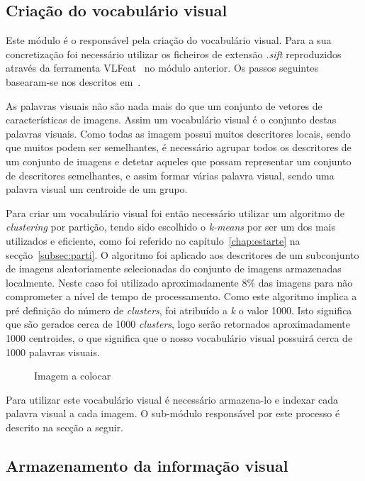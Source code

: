 \subsection{Criação do vocabulário visual}

Este módulo é o responsável pela criação do vocabulário visual. Para a sua concretização foi necessário utilizar os ficheiros de extensão \textit{.sift} reproduzidos através da ferramenta VLFeat~\cite{vedaldi08vlfeat} no módulo anterior. Os passos seguintes basearam-se nos descritos em~\cite{Solem2012}. 

As palavras visuais não são nada mais do que um conjunto de vetores de características de imagens. Assim um vocabulário visual é o conjunto destas palavras visuais. Como todas as imagem possui muitos descritores locais, sendo que muitos podem ser semelhantes, é necessário agrupar todos os descritores de um conjunto de imagens e detetar aqueles que possam representar um conjunto de descritores semelhantes, e assim formar várias palavra visual, sendo uma palavra visual um centroide de um grupo.

Para criar um vocabulário visual foi então necessário utilizar um algoritmo de \textit{clustering} por partição, tendo sido escolhido o \textit{k-means} por ser um dos mais utilizados e eficiente, como foi referido no capítulo~\ref{chap:estarte} na secção~\ref{subsec:parti}. O algoritmo foi aplicado aos descritores de um subconjunto de imagens aleatoriamente selecionadas do conjunto de imagens armazenadas localmente. Neste caso foi utilizado aproximadamente 8\% das imagens para não comprometer a nível de tempo de processamento. Como este algoritmo implica a pré definição do número de \textit{clusters}, foi atribuído a \textit{k} o valor 1000. Isto significa que são gerados cerca de 1000 \textit{clusters}, logo serão retornados aproximadamente 1000 centroides, o que significa que o nosso vocabulário visual possuirá cerca de 1000 palavras visuais.

\begin{figure}
\centering
Imagem a colocar
\end{figure}

Para utilizar este vocabulário visual é necessário armazena-lo e indexar cada palavra visual a cada imagem. O sub-módulo responsável por este processo é descrito na secção a seguir.

\subsection{Armazenamento da informação visual}

